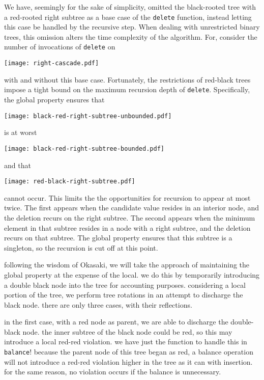 \documentclass[preprint]{sigplanconf}
\begin{document}
We have, seemingly for the sake of simplicity, omitted the black-rooted tree with a red-rooted right subtree as a base case of the \texttt{delete} function, instead letting this case be handled by the recursive step. When dealing with unrestricted binary trees, this omission alters the time complexity of the algorithm. For, consider the number of invocations of \texttt{delete} on
\begin{center}
\texttt{[image: right-cascade.pdf]}
\end{center}
with and without this base case. Fortunately, the restrictions of red-black trees impose a tight bound on the maximum recursion depth of \texttt{delete}. Specifically, the global property ensures that
\begin{center}
\texttt{[image: black-red-right-subtree-unbounded.pdf]}
\end{center}
is at worst
\begin{center}
\texttt{[image: black-red-right-subtree-bounded.pdf]}
\end{center}
and that
\begin{center}
\texttt{[image: red-black-right-subtree.pdf]}
\end{center}
cannot occur. This limits the the opportunities for recursion to appear at most twice. The first appears when the candidate value resides in an interior node, and the deletion recurs on the right subtree. The second appears when the minimum element in that subtree resides in a node with a right subtree, and the deletion recurs on that subtree. The global property ensures that this subtree is a singleton, so the recursion is cut off at this point.

following the wisdom of Okasaki, we will take the approach of maintaining the global property at the expense of the local. we do this by temporarily introducing a double black node into the tree for accounting purposes. considering a local portion of the tree, we perform tree rotations in an attempt to discharge the black node. there are only three cases, with their reflections.

in the first case, with a red node as parent, we are able to discharge the double-black node. the inner subtree of the black node could be red, so this may introduce a local red-red violation. we have just the function to handle this in \texttt{balance}! because the parent node of this tree began as red, a balance operation will not introduce a red-red violation higher in the tree as it can with insertion. for the same reason, no violation occurs if the balance is unnecessary.
\end{document}
